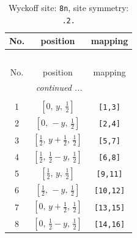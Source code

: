 \documentclass[fleqn,8pt]{jsarticle}
\begin{document}
\begin{longtable}{ccc}
\caption{Wyckoff site: {\tt 8n}, site symmetry: {\tt .2.}}
 \\
 \hline \hline
No. & position & mapping \\ \hline \endfirsthead

\multicolumn{2}{l}{\tablename\ \thetable{}} \\
 \hline \hline
No. & position & mapping \\ \hline \endhead

 \hline \hline
\multicolumn{2}{r}{\footnotesize\it continued ...} \\ \endfoot

 \hline \hline
\multicolumn{2}{r}{} \\ \endlastfoot

1 & $\left[ 0,\, y,\, \frac{1}{2} \right]$ & {\tt [1,3]} \\ \hline
2 & $\left[ 0,\, - y,\, \frac{1}{2} \right]$ & {\tt [2,4]} \\ \hline
3 & $\left[ \frac{1}{2},\, y + \frac{1}{2},\, \frac{1}{2} \right]$ & {\tt [5,7]} \\ \hline
4 & $\left[ \frac{1}{2},\, \frac{1}{2} - y,\, \frac{1}{2} \right]$ & {\tt [6,8]} \\ \hline
5 & $\left[ \frac{1}{2},\, y,\, \frac{1}{2} \right]$ & {\tt [9,11]} \\ \hline
6 & $\left[ \frac{1}{2},\, - y,\, \frac{1}{2} \right]$ & {\tt [10,12]} \\ \hline
7 & $\left[ 0,\, y + \frac{1}{2},\, \frac{1}{2} \right]$ & {\tt [13,15]} \\ \hline
8 & $\left[ 0,\, \frac{1}{2} - y,\, \frac{1}{2} \right]$ & {\tt [14,16]} \\
\end{longtable}
\renewcommand{\arraystretch}{1.2}
\end{document}
